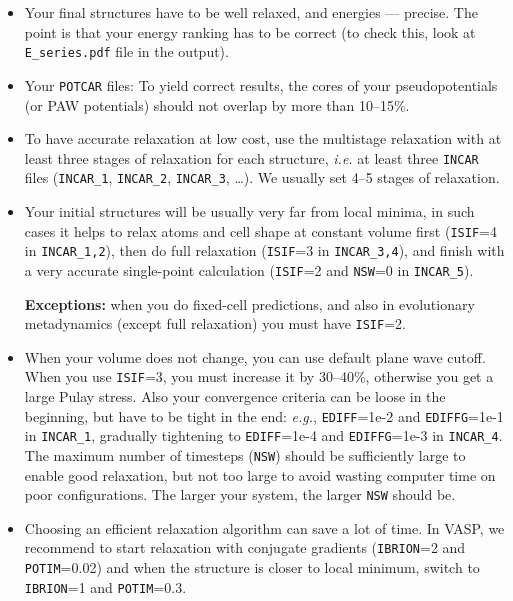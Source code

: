 \documentclass[12pt]{article}
\newcommand{\keyword}[1]{\texttt{#1}}
\newcommand{\file}[1]{\texttt{#1}}
\begin{document}
\begin{itemize}

\item Your final structures have to be well relaxed, and energies --- precise.
The point is that your energy ranking has to be correct (to check this, look at
\file{E\_series.pdf} file in the output).

\item Your \file{POTCAR} files: To yield correct results, the cores of your
pseudopotentials (or PAW potentials) should not overlap by more than 10--15\%.

\item To have accurate relaxation at low cost, use the multistage relaxation
with at least three stages of relaxation for each structure,  \emph{i.e.} at
least three \file{INCAR} files (\file{INCAR\_1}, \file{INCAR\_2},
\file{INCAR\_3}, \ldots). We usually set 4--5 stages of relaxation.

\item Your initial structures will be usually very far from local minima, in
such cases it helps to relax atoms and cell shape at constant volume first
(\keyword{ISIF}=4 in \file{INCAR\_1,2}), then do full relaxation
(\keyword{ISIF}=3 in \file{INCAR\_3,4}), and finish with a very accurate
single-point calculation (\keyword{ISIF}=2 and \keyword{NSW}=0 in
\file{INCAR\_5}).

\textbf{Exceptions:} when you do fixed-cell predictions, and also in
evolutionary metadynamics (except full relaxation) you must have
\keyword{ISIF}=2.

\item When your volume does not change, you can use default plane wave cutoff.
When you use \keyword{ISIF}=3, you must increase it by 30--40\%, otherwise you
get a large Pulay stress. Also your convergence criteria can be loose in the
beginning, but have to be tight in the end: \emph{e.g.}, \keyword{EDIFF}=1e-2
and \keyword{EDIFFG}=1e-1 in \file{INCAR\_1}, gradually tightening to
\keyword{EDIFF}=1e-4 and \keyword{EDIFFG}=1e-3 in \file{INCAR\_4}. The maximum
number of timesteps (\keyword{NSW}) should be sufficiently large to enable good
relaxation, but not too large to avoid wasting computer time on poor
configurations. The larger your system, the larger \keyword{NSW} should be.

\item Choosing an efficient relaxation algorithm can save a lot of time. In
VASP, we recommend to start relaxation with conjugate gradients
(\keyword{IBRION}=2 and \keyword{POTIM}=0.02) and when the structure is closer
to local minimum, switch to \keyword{IBRION}=1 and \keyword{POTIM}=0.3.


\end{itemize}
\end{document}
